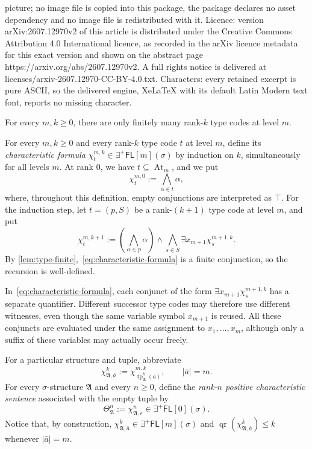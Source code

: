 \documentclass[10pt,a4paper]{amsart}
\newcommand{\At}{\operatorname{At}}
\newcommand{\A}{\mathfrak{A}}
\newcommand{\EPFL}{\exists^{+}\!\mathsf{FL}}
\newcommand{\qr}{\operatorname{qr}}
\newcommand{\tp}{\operatorname{tp}}
\newcommand{\true}{\top}
\begin{document}
picture; no image file is copied into this package, the package declares no asset dependency and no image file is redistributed with it. Licence: version arXiv:2607.12970v2 of this article is distributed under the Creative Commons Attribution 4.0 International licence, as recorded in the arXiv licence metadata for this exact version and shown on the abstract page https://arxiv.org/abs/2607.12970v2. A full rights notice is delivered at licenses/arxiv-2607.12970-CC-BY-4.0.txt. Characters: every retained excerpt is pure ASCII, so the delivered engine, XeLaTeX with its default Latin Modern text font, reports no missing character.
\begin{lem}\label{lem:type-finite}
For every $m,k\geq0$, there are only finitely many rank-$k$ type codes at
level $m$.
\end{lem}

\begin{defi}\label{def:characteristic-formula}
For every $m,k\geq0$ and every rank-$k$ type code $t$ at level $m$, define
its \emph{characteristic formula}
$\chi_t^{m,k}\in\EPFL[m](\sigma)$ by induction on $k$, simultaneously for all
levels $m$.  At rank $0$, we have $t\subseteq\At_m$, and we put
\[
  \chi_t^{m,0}:=\bigwedge_{\alpha\in t}\alpha,
\]
where, throughout this definition, empty conjunctions are interpreted as
$\true$.  For the induction step, let $t=(p,S)$ be a rank-$(k+1)$ type code
at level $m$, and put
\begin{equation}
  \chi_t^{m,k+1}
  :=
  \left(\bigwedge_{\alpha\in p}\alpha\right)
  \wedge
  \bigwedge_{s\in S}
     \exists x_{m+1}\chi_s^{m+1,k}.
  \label{eq:characteristic-formula}
\end{equation}
By \cref{lem:type-finite},~\eqref{eq:characteristic-formula} is a finite
conjunction, so the
recursion is well-defined.

In~\eqref{eq:characteristic-formula}, each conjunct of the form
$\exists x_{m+1}\chi_s^{m+1,k}$ has a separate quantifier.  Different
successor type codes may therefore use different witnesses, even though the
same variable symbol $x_{m+1}$ is reused.  All these conjuncts are evaluated
under the same assignment to $x_1,\ldots,x_m$, although only a suffix of these
variables may actually occur freely.

For a particular structure and tuple, abbreviate
\[
  \chi_{\A,\bar a}^{k}
  :=
  \chi_{\tp_{\A}^{k}(\bar a)}^{m,k},
  \qquad |\bar a|=m.
\]
For every $\sigma$-structure $\A$ and every $n\geq0$, define the
\emph{rank-$n$ positive characteristic sentence} associated with the empty
tuple by
\[
   \Theta_{\A}^{n}
   :=
   \chi_{\A,\epsilon}^{n}
   \in\EPFL[0](\sigma).
\]
Notice that, by construction,
$\chi_{\A,\bar a}^{k}\in\EPFL[m](\sigma)$ and
$\qr(\chi_{\A,\bar a}^{k})\leq k$ whenever $|\bar a|=m$.
\end{defi}
\end{document}

